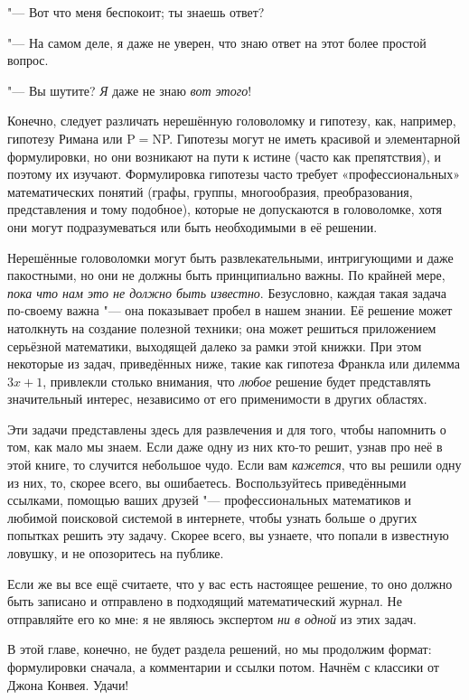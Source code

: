 \documentclass[twoside]{book}
\begin{document}
"--- Вот что меня беспокоит; ты знаешь ответ?

"--- На самом деле, я даже не уверен, что знаю ответ на этот более простой вопрос.

"--- Вы шутите? \emph{Я} даже не знаю \emph{вот этого}!

Конечно, следует различать нерешённую головоломку и гипотезу, как, например, гипотезу Римана или P${}={}$NP.
Гипотезы могут не иметь красивой и элементарной формулировки, но они возникают на пути к истине (часто как препятствия), и поэтому их изучают.
Формулировка гипотезы часто требует «профессиональных» математических понятий (графы, группы, многообразия, преобразования, представления и тому подобное), которые не допускаются в головоломке, хотя они могут подразумеваться или быть необходимыми в её решении.

Нерешённые головоломки могут быть развлекательными, интригующими и даже пакостными,
но они не должны быть принципиально важны. 
По крайней мере, \emph{пока что нам это не должно быть известно}.
Безусловно, каждая такая задача по-своему важна "--- она показывает пробел в нашем знании.
Её решение может натолкнуть на создание полезной техники;
она может решиться приложением серьёзной математики, выходящей далеко за рамки этой книжки.
При этом некоторые из задач, приведённых ниже, такие как гипотеза Франкла или дилемма $3x+1$, привлекли столько внимания, что \emph{любое} решение будет представлять значительный интерес, независимо от его применимости в других областях.

Эти задачи представлены здесь для развлечения и для того, чтобы напомнить о том, как мало мы знаем.
Если даже одну из них кто-то решит, узнав про неё в этой книге, то случится небольшое чудо.
Если вам \emph{кажется}, что вы решили одну из них, то, скорее всего, вы ошибаетесь.
Воспользуйтесь приведёнными ссылками, помощью ваших друзей "--- профессиональных математиков и любимой поисковой системой в интернете, чтобы узнать больше о других попытках решить эту задачу.
Скорее всего, вы узнаете, что попали в известную ловушку, и не опозоритесь на публике.

Если же вы все ещё считаете, что у вас есть настоящее решение, то оно должно быть записано и отправлено в подходящий математический журнал.
Не отправляйте его ко мне: я не являюсь экспертом \emph{ни в одной} из этих задач.

\medskip

В этой главе, конечно, не будет раздела решений, но мы продолжим формат: формулировки сначала, а комментарии и ссылки потом.
Начнём с классики от Джона Конвея.
Удачи!
\end{document}
